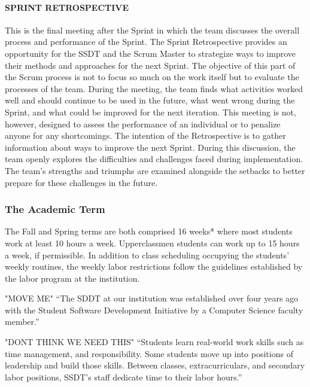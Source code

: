 \paragraph{SPRINT RETROSPECTIVE}
This is the final meeting after the Sprint in which the team discusses the overall process and performance of the Sprint. The Sprint Retrospective provides an opportunity for the SSDT and the Scrum Master to strategize ways to improve their methods and approaches for the next Sprint. The objective of this part of the Scrum process is not to focus so much on the work itself but to evaluate the processes of the team. During the meeting, the team finds what activities worked well and should continue to be used in the future, what went wrong during the Sprint, and what could be improved for the next iteration. This meeting is not, however, designed to assess the performance of an individual or to penalize anyone for any shortcomings. The intention of the Retrospective is to gather information about ways to improve the next Sprint. During this discussion, the team openly explores the difficulties and challenges faced during implementation. The team's strengths and triumphs are examined alongside the setbacks to better prepare for these challenges in the future.

\subsubsection{The Academic Term} 
The Fall and Spring terms are both comprised 16 weeks* where most students work at least 10 hours a week. Upperclassmen students can work up to 15 hours a week, if permissible. In addition to class scheduling occupying the students' weekly routines, the weekly labor restrictions follow the guidelines established by the labor program at the institution.


"MOVE ME" ``The SDDT at our institution was established over four years ago with the Student Software Development Initiative by a Computer Science faculty member.''

"DONT THINK WE NEED THIS" ``Students learn real-world work skills such as time management, and responsibility. Some students move up into positions of leadership and build those skills. Between classes, extracurriculars, and secondary labor positions, SSDT's staff dedicate time to their labor hours.''